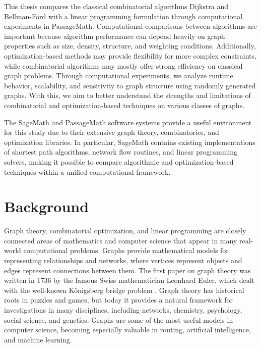 \documentclass[12pt]{report}
\begin{document}
This thesis compares the classical combinatorial algorithms Dijkstra and Bellman-Ford with a linear programming formulation through computational experiments in PassageMath. Computational comparisons between algorithms are important because algorithm performance can depend heavily on graph properties such as size, density, structure, and weighting conditions. Additionally, optimization-based methods may provide flexibility for more complex constraints, while combinatorial algorithms may mostly offer strong efficiency on classical graph problems. Through computational experiments, we analyze runtime behavior, scalability, and sensitivity to graph structure using randomly generated graphs. With this, we aim to better understand the strengths and limitations of combinatorial and optimization-based techniques on various classes of graphs.

The SageMath and PassageMath software systems provide a useful environment for this study due to their extensive graph theory, combinatorics, and optimization libraries. In particular, SageMath contains existing implementations of shortest path algorithms, network flow routines, and linear programming solvers, making it possible to compare algorithmic and optimization-based techniques within a unified computational framework.


\chapter{Background}

Graph theory, combinatorial optimization, and linear programming are closely connected areas of mathematics and computer science that appear in many real-world computational problems. Graphs provide mathematical models for representing relationships and networks, where vertices represent objects and edges represent connections between them. The first paper on graph theory was written in 1736 by the famous Swiss mathematician Leonhard Euler, which dealt with the well-known K\"onigsberg bridge problem \cite{Brualdi}. Graph theory has historical roots in puzzles and games, but today it provides a natural framework for investigations in many disciplines, including networks, chemistry, psychology, social science, and genetics. Graphs are some of the most useful models in computer science, becoming especially valuable in routing, artificial intelligence, and machine learning.
\end{document}
